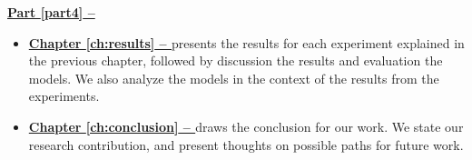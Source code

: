 \vspace{0.5cm}\noindent
\begin{minipage}{\linewidth}
    \textbf{{\hyperref[part4]{Part \ref{part4} -- }}}
    \begin{itemize}
        \item\textbf{\hyperref[ch:results]{Chapter \ref{ch:results} -- }} presents the results for each experiment explained in the previous chapter, followed by discussion the results and evaluation the models. We also analyze the models in the context of the results from the experiments.
        \item\textbf{\hyperref[ch:conclusion]{Chapter \ref{ch:conclusion} -- }} draws the conclusion for our work. We state our research contribution, and present thoughts on possible paths for future work.
    \end{itemize}
\end{minipage}